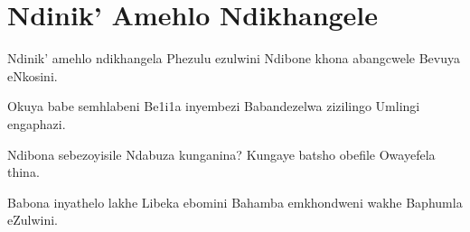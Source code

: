 \starttocol
\chapter{Ndinik' Amehlo Ndikhangele}
\nexttocol
\hfill{\it }
\stoptocol
\starttocol
\startlines
{\sc Ndinik'} amehlo ndikhangela
Phezulu ezulwini
Ndibone khona abangcwele
Bevuya eNkosini.

Okuya babe semhlabeni
Be1i1a inyembezi
Babandezelwa zizilingo 
Umlingi engaphazi.

Ndibona sebezoyisile
Ndabuza kunganina?
Kungaye batsho obefile
Owayefela thina.

Babona inyathelo lakhe
Libeka ebomini
Bahamba emkhondweni wakhe
Baphumla eZulwini.

\stoplines
\nexttocol

\stoptocol

